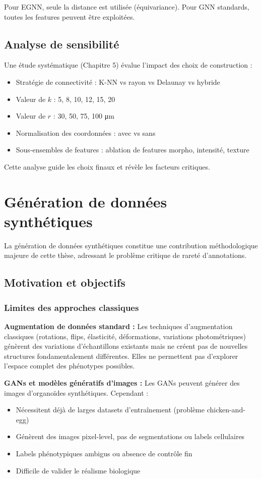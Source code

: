 Pour EGNN, seule la distance est utilisée (équivariance). Pour GNN standards, toutes les features peuvent être exploitées.

\subsection{Analyse de sensibilité}

Une étude systématique (Chapitre 5) évalue l'impact des choix de construction :
\begin{itemize}
    \item Stratégie de connectivité : K-NN vs rayon vs Delaunay vs hybride
    \item Valeur de $k$ : {5, 8, 10, 12, 15, 20}
    \item Valeur de $r$ : {30, 50, 75, 100} μm
    \item Normalisation des coordonnées : avec vs sans
    \item Sous-ensembles de features : ablation de features morpho, intensité, texture
\end{itemize}

Cette analyse guide les choix finaux et révèle les facteurs critiques.

\section{Génération de données synthétiques}

La génération de données synthétiques constitue une contribution méthodologique majeure de cette thèse, adressant le problème critique de rareté d'annotations.

\subsection{Motivation et objectifs}

\subsubsection{Limites des approches classiques}

\textbf{Augmentation de données standard :}
Les techniques d'augmentation classiques (rotations, flips, élasticité, déformations, variations photométriques) génèrent des variations d'échantillons existants mais ne créent pas de nouvelles structures fondamentalement différentes. Elles ne permettent pas d'explorer l'espace complet des phénotypes possibles.

\textbf{GANs et modèles génératifs d'images :}
Les GANs peuvent générer des images d'organoïdes synthétiques. Cependant :
\begin{itemize}
    \item Nécessitent déjà de larges datasets d'entraînement (problème chicken-and-egg)
    \item Génèrent des images pixel-level, pas de segmentations ou labels cellulaires
    \item Labels phénotypiques ambigus ou absence de contrôle fin
    \item Difficile de valider le réalisme biologique
\end{itemize}

